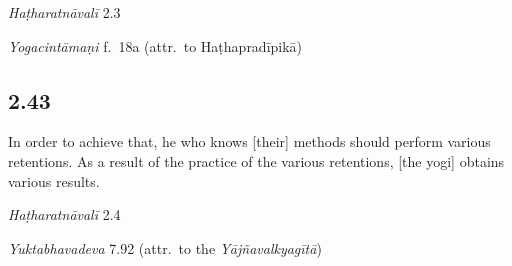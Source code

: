 \begin{ekdosis}

\begin{testimonia}[hp02_042]
\emph{Haṭharatnāvalī} 2.3

\begin{versinnote}
\end{versinnote}

\emph{Yogacintāmaṇi} f.~18a (attr.~to Haṭhapradīpikā)

\begin{versinnote}
\end{versinnote}

\end{testimonia}


\subsection*{2.43}
\begin{translation}[hp02_043]
In order to achieve that, he who knows [their] methods should perform various retentions. As a result of the practice of the various retentions, [the yogi] obtains various results.
\end{translation}


\begin{testimonia}[hp02_043]
\emph{Haṭharatnāvalī} 2.4
\begin{versinnote}
\end{versinnote}

\emph{Yuktabhavadeva} 7.92 (attr.~to the \emph{Yājñavalkyagītā})


\end{testimonia}
\end{ekdosis}
